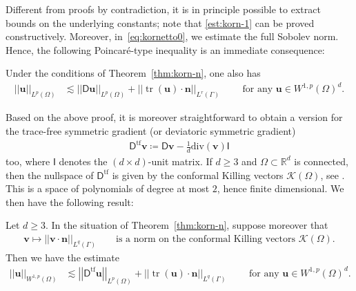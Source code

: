 \documentclass[reqno,a4paper]{amsart}
\def\norm#1{\left|\!\left| #1 \right|\!\right|}
\def\tens#1{\pmb{\mathsf{#1}}}
\def\vec#1{\boldsymbol{#1}}
\def\R{\mathbb{R}}
\def\tr{\mathop{\mathrm{tr}}\nolimits}
\def\bn{\vec{n}}
\def\bu{\vec{u}}
\def\bv{\vec{v}}
\def\BD{\tens{D}}
\def\BI{\tens{I}}
\begin{document}
Different from proofs by contradiction, it is in principle possible to extract bounds on the underlying constants; note that \eqref{est:korn-1} can be proved constructively. Moreover, in~\eqref{eq:kornetto0}, we estimate the full Sobolev norm. 
	Hence, the following Poincar\'{e}-type inequality is an immediate consequence:
	
	\begin{corollary} 
		Under the conditions of Theorem~\ref{thm:korn-n}, one also has
		\begin{align}\label{eq:poincare}
			\norm{ \bu}_{L^p(\Omega)} 
			&\lesssim \norm{\BD\bu}_{L^p(\Omega)} + \norm{\tr(\bu) \cdot \bn}_{L^r(\Gamma)}\qquad \text{ for any } \bu \in W^{1,p}(\Omega)^{d}.
		\end{align}
	\end{corollary}
	Based on the above proof, it is moreover straightforward to obtain a version for the trace-free symmetric gradient (or deviatoric symmetric gradient) 
	\begin{align*}
		\BD^{\mathrm{tf}}\bv \coloneqq \BD\bv - \frac{1}{d}\mathrm{div}(\bv)\BI
	\end{align*}
	too, where $\BI$ denotes the $(d\times d)$-unit matrix. If $d\geq 3$ and $\Omega\subset\R^{d}$ is connected, then the nullspace of $\BD^{\mathrm{tf}}$ is given by the conformal Killing vectors $\mathcal{K}(\Omega)$, see \cite{Resetnjak1}. 
	This is a space of polynomials of degree at most $2$, hence finite dimensional. We then have the following result: 
	\begin{corollary} 
		Let $d\geq 3$. 
		In the situation of Theorem~\ref{thm:korn-n}, suppose moreover that 
  \begin{align}\label{eq:trampolin1}
			\bv \mapsto \norm{\bv \cdot \bn}_{L^q(\Gamma)}\qquad \text{is a norm on the  conformal Killing vectors $\mathcal{K}(\Omega)$}.
		\end{align}
Then we have the estimate 
		\begin{align}\label{eq:tfsym}
			\norm{\bu}_{W^{1,p}(\Omega)} &\lesssim \norm{\BD^{\mathrm{tf}}\bu}_{L^p(\Omega)} + \norm{\tr(\bu) \cdot \bn}_{L^q(\Gamma)}\qquad \text{ for any } \bu \in W^{1,p}(\Omega)^{d}. 
		\end{align}
	\end{corollary}
\end{document}
